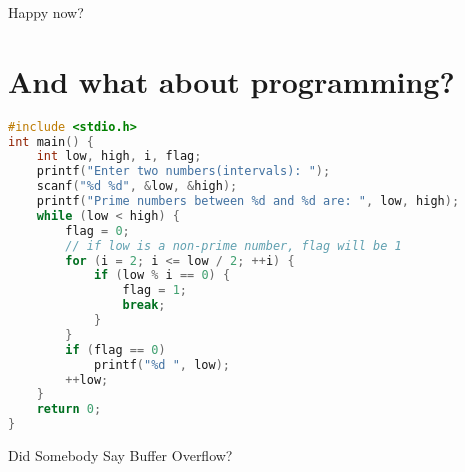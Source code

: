 Happy now?

\section{And what about programming?}

\begin{lstlisting}[language=C]
#include <stdio.h>
int main() {
    int low, high, i, flag;
    printf("Enter two numbers(intervals): ");
    scanf("%d %d", &low, &high);
    printf("Prime numbers between %d and %d are: ", low, high);
    while (low < high) {
        flag = 0;
        // if low is a non-prime number, flag will be 1
        for (i = 2; i <= low / 2; ++i) {
            if (low % i == 0) {
                flag = 1;
                break;
            }
        }
        if (flag == 0)
            printf("%d ", low);
        ++low;
    }
    return 0;
}
\end{lstlisting}

Did Somebody Say Buffer Overflow?


